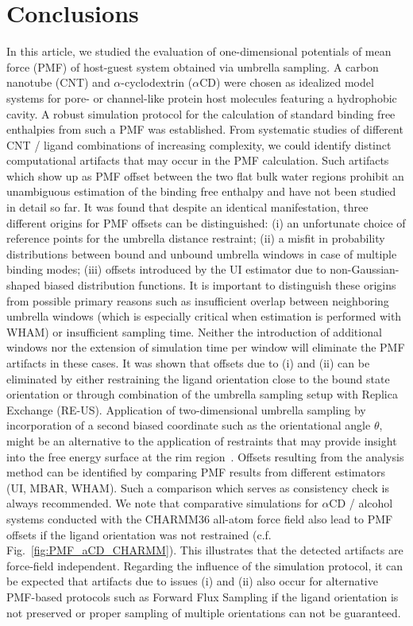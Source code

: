\documentclass[9pt,lessons,pubversion]{livecoms}
\begin{document}
\section{Conclusions}

In this article, we studied the evaluation of one-dimensional potentials of mean force (PMF) of host-guest system obtained via umbrella sampling. 
A carbon nanotube (CNT) and $\alpha$-cyclodextrin ($\alpha$CD) were chosen as idealized model systems for pore- or channel-like protein host molecules featuring a hydrophobic cavity. 
A robust simulation protocol for the calculation of standard binding free enthalpies from such a PMF was established.
From systematic studies of different CNT / ligand combinations of increasing complexity, we could identify distinct computational artifacts that may occur in the PMF calculation.
Such artifacts which show up as PMF offset between the two flat bulk water regions prohibit an unambiguous estimation of the binding free enthalpy and have not been studied in detail so far.
It was found that despite an identical manifestation, three different origins for PMF offsets can be distinguished:
(i) an unfortunate choice of reference points for the umbrella distance restraint;
(ii) a misfit in probability distributions between bound and unbound umbrella windows in case of multiple binding modes; 
(iii) offsets introduced by the UI estimator due to non-Gaussian-shaped biased distribution functions.
It is important to distinguish these origins from possible primary reasons such as insufficient overlap between neighboring umbrella windows (which is especially critical when estimation is performed with WHAM) 
or insufficient sampling time.
Neither the introduction of additional windows nor the extension of simulation time per window will eliminate the PMF artifacts in these cases.
It was shown that offsets due to (i) and (ii) can be eliminated by either restraining the ligand orientation close to the bound state orientation or through combination of the umbrella sampling setup with Replica Exchange (RE-US). 
Application of two-dimensional umbrella sampling by incorporation of a second biased coordinate such as the orientational angle $\theta$, 
might be an alternative to the application of restraints that may provide insight into the free energy surface at the rim region~\cite{allen2006ion, allen2006molecular, singh2015two}.
Offsets resulting from the analysis method can be identified by comparing PMF results from different estimators (UI, MBAR, WHAM). 
Such a comparison which serves as consistency check is always recommended. 
We note that comparative simulations for $\alpha$CD / alcohol systems conducted with the CHARMM36 all-atom force field 
also lead to PMF offsets if the ligand orientation was not restrained (c.f. Fig.~\ref{fig:PMF_aCD_CHARMM}). 
This illustrates that the detected artifacts are force-field independent.
Regarding the influence of the simulation protocol, it can be expected that artifacts due to issues (i) and (ii) also 
occur for alternative PMF-based protocols such as Forward Flux Sampling if the ligand orientation is not preserved or proper sampling of multiple orientations can not be guaranteed.
\end{document}
